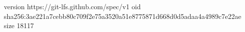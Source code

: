 version https://git-lfs.github.com/spec/v1
oid sha256:3ae221a7cebb80c709f2e75a3520a51e8775871d668d0d5adaa4a4989c7e22ae
size 18117

